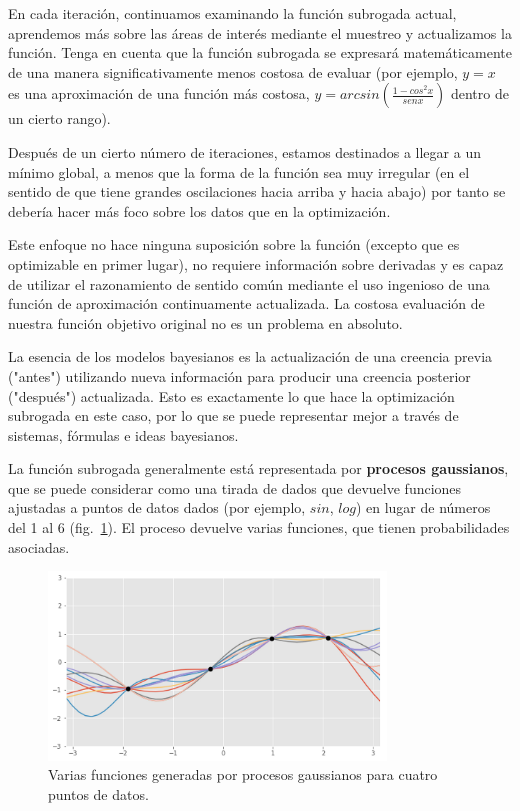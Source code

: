 \documentclass[a4paper,12pt]{article}
\begin{document}
En cada iteración, continuamos examinando la función subrogada actual, aprendemos más sobre las áreas de interés mediante el muestreo y actualizamos la función. Tenga en cuenta que la función subrogada se expresará matemáticamente de una manera significativamente menos costosa de evaluar (por ejemplo, $y=x$ es una aproximación de una función más costosa, $y = arcsin \left( \frac{1-cos^2x}{sen x} \right)$ dentro de un cierto rango).

Después de un cierto número de iteraciones, estamos destinados a llegar a un mínimo global, a menos que la forma de la función sea muy irregular (en el sentido de que tiene grandes oscilaciones hacia arriba y hacia abajo) por tanto se debería hacer más foco sobre los datos que en la optimización.

Este enfoque no hace ninguna suposición sobre la función (excepto que es optimizable en primer lugar), no requiere información sobre derivadas y es capaz de utilizar el razonamiento de sentido común mediante el uso ingenioso de una función de aproximación continuamente actualizada. La costosa evaluación de nuestra función objetivo original no es un problema en absoluto.

La esencia de los modelos bayesianos es la actualización de una creencia previa ("antes") utilizando nueva información para producir una creencia posterior ("después") actualizada. Esto es exactamente lo que hace la optimización subrogada en este caso, por lo que se puede representar mejor a través de sistemas, fórmulas e ideas bayesianos.

La función subrogada generalmente está representada por \textbf{procesos gaussianos}, que se puede considerar como una tirada de dados que devuelve funciones ajustadas a puntos de datos dados (por ejemplo, $sin$, $log$) en lugar de números del 1 al 6 (fig.~\ref{fig:bayes4}). El proceso devuelve varias funciones, que tienen probabilidades asociadas.

\begin{figure}[H]
	\begin{center}
		\includegraphics[width=0.8\textwidth]{bayes_opt_4.png}
		\caption{Varias funciones generadas por procesos gaussianos para cuatro puntos de datos. \citep{Ye2020Oct}}
		\label{fig:bayes4}
	\end{center}
\end{figure}
\end{document}

